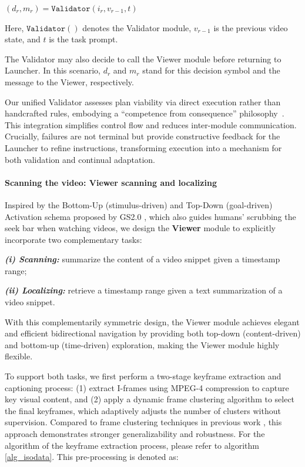 \begin{center}
$(d_r, m_r) = \texttt{Validator}(i_r, v_{r-1}, t)$
\end{center}

Here, $\texttt{Validator}()$ denotes the Validator module, $v_{r-1}$ is the previous video state, and $t$ is the task prompt. 

The Validator may also decide to call the Viewer module before returning to Launcher. In this scenario, $d_r$ and $m_r$ stand for this decision symbol and the message to the Viewer, respectively.

Our unified Validator assesses plan viability via direct execution rather than handcrafted rules, embodying a ``competence from consequence'' philosophy~\citep{brooks1991intelligence}. This integration simplifies control flow and reduces inter-module communication. Crucially, failures are not terminal but provide constructive feedback for the Launcher to refine instructions, transforming execution into a mechanism for both validation and continual adaptation.

\paragraph{Scanning the video: Viewer scanning and localizing}

Inspired by the Bottom-Up (stimulus-driven) and Top-Down (goal-driven) Activation schema proposed by GS2.0 \citep{GS2.0NO2}, which also guides humans' scrubbing the seek bar when watching videos, we design the \textbf{Viewer} module to explicitly incorporate two complementary tasks: 

\textit{\textbf{(i) Scanning:}} summarize the content of a video snippet given a timestamp range;

\textit{\textbf{(ii) Localizing:}} retrieve a timestamp range given a text summarization of a video snippet.

With this complementarily symmetric design, the Viewer module achieves elegant and efficient bidirectional navigation by providing both top-down (content-driven) and bottom-up (time-driven) exploration, making the Viewer module highly flexible.

To support both tasks, we first perform a two-stage keyframe extraction and captioning process: (1) extract I-frames using MPEG-4 compression to capture key visual content, and (2) apply a dynamic frame clustering algorithm to select the final keyframes, which adaptively adjusts the number of clusters without supervision. Compared to frame clustering techniques in previous work \citep{wang2024videotreeadaptivetreebasedvideo}, this approach demonstrates stronger generalizability and robustness. For the algorithm of the keyframe extraction process, please refer to algorithm \ref{alg_isodata}. This pre-processing is denoted as:

